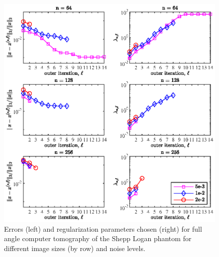 \begin{figure}[htbp]
\begin{center}
\includegraphics{figures/full_angle_errs_and_reg_params}
\caption{Errors (left) and regularization parameters chosen (right) for full angle computer tomography of the Shepp Logan phantom for different image sizes (by row) and noise levels.}
\label{fig:full_angle_errs_and_reg_params}
\end{center}
\end{figure}
